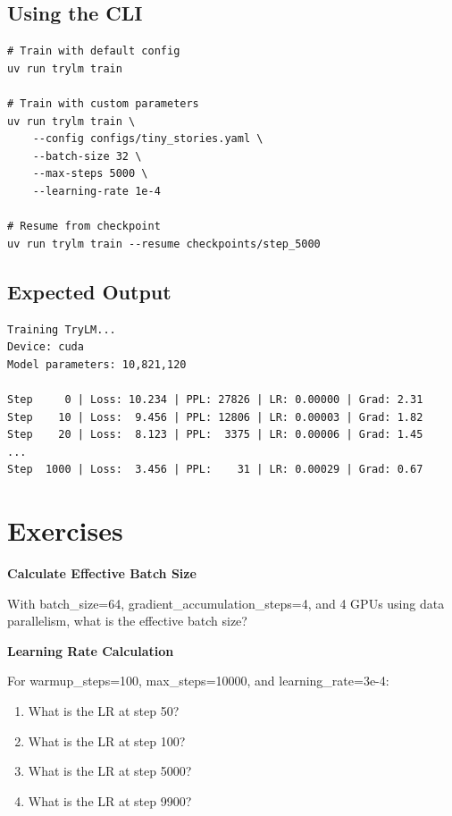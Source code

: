 \subsection{Using the CLI}

\begin{lstlisting}[style=shell]
# Train with default config
uv run trylm train

# Train with custom parameters
uv run trylm train \
    --config configs/tiny_stories.yaml \
    --batch-size 32 \
    --max-steps 5000 \
    --learning-rate 1e-4

# Resume from checkpoint
uv run trylm train --resume checkpoints/step_5000
\end{lstlisting}

\subsection{Expected Output}

\begin{lstlisting}[style=shell, numbers=none]
Training TryLM...
Device: cuda
Model parameters: 10,821,120

Step     0 | Loss: 10.234 | PPL: 27826 | LR: 0.00000 | Grad: 2.31
Step    10 | Loss:  9.456 | PPL: 12806 | LR: 0.00003 | Grad: 1.82
Step    20 | Loss:  8.123 | PPL:  3375 | LR: 0.00006 | Grad: 1.45
...
Step  1000 | Loss:  3.456 | PPL:    31 | LR: 0.00029 | Grad: 0.67
\end{lstlisting}

\section{Exercises}

\begin{exercise}
\textbf{Calculate Effective Batch Size}

With batch\_size=64, gradient\_accumulation\_steps=4, and 4 GPUs using data parallelism, what is the effective batch size?
\end{exercise}

\begin{exercise}
\textbf{Learning Rate Calculation}

For warmup\_steps=100, max\_steps=10000, and learning\_rate=3e-4:
\begin{enumerate}
    \item What is the LR at step 50?
    \item What is the LR at step 100?
    \item What is the LR at step 5000?
    \item What is the LR at step 9900?
\end{enumerate}
\end{exercise}

